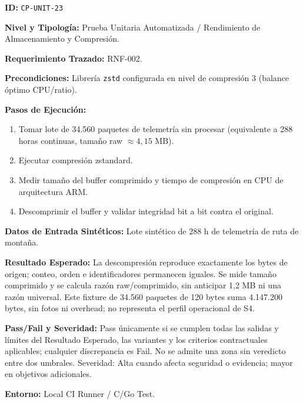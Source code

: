\par\noindent\textbf{ID:} \texttt{C\allowbreak{}P\allowbreak{}-\allowbreak{}U\allowbreak{}N\allowbreak{}I\allowbreak{}T\allowbreak{}-\allowbreak{}2\allowbreak{}3\allowbreak{}}\par
\par\noindent\textbf{Nivel y Tipología:} Prueba Unitaria Automatizada / Rendimiento de Almacenamiento y Compresión.\par
\par\noindent\textbf{Requerimiento Trazado:} RNF-002.\par
\par\noindent\textbf{Precondiciones:} Librería \texttt{z\allowbreak{}s\allowbreak{}t\allowbreak{}d\allowbreak{}} configurada en nivel de compresión 3 (balance óptimo CPU/ratio).\par
\par\noindent\textbf{Pasos de Ejecución:} \par
\begin{enumerate}
\item Tomar lote de 34.560 paquetes de telemetría sin procesar (equivalente a 288 horas continuas, tamaño raw \(\approx 4{,}15\text{ MB}\)).
\item Ejecutar compresión zstandard.
\item Medir tamaño del buffer comprimido y tiempo de compresión en CPU de arquitectura ARM.
\item Descomprimir el buffer y validar integridad bit a bit contra el original.
\end{enumerate}
\par\noindent\textbf{Datos de Entrada Sintéticos:} Lote sintético de 288 h de telemetría de ruta de montaña.\par
\par\noindent\textbf{Resultado Esperado:} La descompresión reproduce exactamente los bytes de origen; conteo, orden e identificadores permanecen iguales. Se mide tamaño comprimido y se calcula razón raw/comprimido, sin anticipar 1,2 MB ni una razón universal. Este fixture de 34.560 paquetes de 120 bytes suma 4.147.200 bytes, sin fotos ni overhead; no representa el perfil operacional de S4.\par
\par\noindent\textbf{Pass/Fail y Severidad:} Pass únicamente si se cumplen todas las salidas y límites del Resultado Esperado, las variantes y los criterios contractuales aplicables; cualquier discrepancia es Fail. No se admite una zona sin veredicto entre dos umbrales. Severidad: Alta cuando afecta seguridad o evidencia; mayor en objetivos adicionales.\par
\par\noindent\textbf{Entorno:} Local CI Runner / C/Go Test.\par







